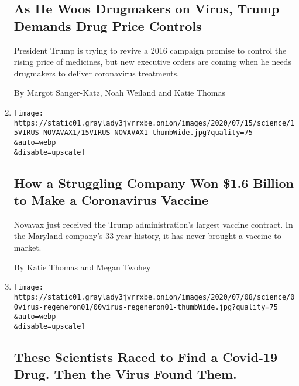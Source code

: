 \begin{enumerate}
  \hypertarget{as-he-woos-drugmakers-on-virus-trump-demands-drug-price-controls}{%
  \subsection{As He Woos Drugmakers on Virus, Trump Demands Drug Price
  Controls}\label{as-he-woos-drugmakers-on-virus-trump-demands-drug-price-controls}}

  President Trump is trying to revive a 2016 campaign promise to control
  the rising price of medicines, but new executive orders are coming
  when he needs drugmakers to deliver coronavirus treatments.

  By Margot Sanger-Katz, Noah Weiland and Katie Thomas
\item
  \href{/2020/07/16/health/coronavirus-vaccine-novavax.html}{}

  \texttt{[image: https://static01.graylady3jvrrxbe.onion/images/2020/07/15/science/15VIRUS-NOVAVAX1/15VIRUS-NOVAVAX1-thumbWide.jpg?quality=75\\\&auto=webp\\\&disable=upscale]}

  \hypertarget{how-a-struggling-company-won-16-billion-to-make-a-coronavirus-vaccine}{%
  \subsection{How a Struggling Company Won \$1.6 Billion to Make a
  Coronavirus
  Vaccine}\label{how-a-struggling-company-won-16-billion-to-make-a-coronavirus-vaccine}}

  Novavax just received the Trump administration's largest vaccine
  contract. In the Maryland company's 33-year history, it has never
  brought a vaccine to market.

  By Katie Thomas and Megan Twohey
\item
  \href{/2020/07/09/health/regeneron-monoclonal-antibodies.html}{}

  \texttt{[image: https://static01.graylady3jvrrxbe.onion/images/2020/07/08/science/00virus-regeneron01/00virus-regeneron01-thumbWide.jpg?quality=75\\\&auto=webp\\\&disable=upscale]}

  \hypertarget{these-scientists-raced-to-find-a-covid-19-drug-then-the-virus-found-them}{%
  \subsection{These Scientists Raced to Find a Covid-19 Drug. Then the
  Virus Found
  Them.}\label{these-scientists-raced-to-find-a-covid-19-drug-then-the-virus-found-them}}


\end{enumerate}
